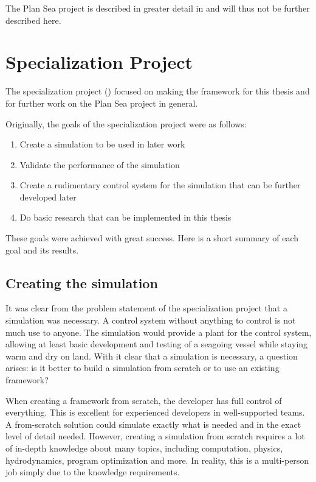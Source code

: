 \documentclass[class=article, crop=false, draft=true]{standalone}
\begin{document}
The Plan Sea project is described in greater detail in \cite{specialization} and will thus not be further described here.

\section{Specialization Project}
The specialization project (\cite{specialization}) focused on making the framework for this thesis and for further work on the Plan Sea project in general.

Originally, the goals of the specialization project were as follows:
\begin{enumerate}
\item Create a simulation to be used in later work
\item Validate the performance of the simulation
\item Create a rudimentary control system for the simulation that can be further developed later
\item Do basic research that can be implemented in this thesis
\end{enumerate}
These goals were achieved with great success. Here is a short summary of each goal and its results.

\subsection{Creating the simulation}
\label{sec:basic_sim}
It was clear from the problem statement of the specialization project that a simulation was necessary. A control system without anything to control is not much use to anyone. The simulation would provide a plant for the control system, allowing at least basic development and testing of a seagoing vessel while staying warm and dry on land. With it clear that a simulation is necessary, a question arises: is it better to build a simulation from scratch or to use an existing framework?

When creating a framework from scratch, the developer has full control of everything. This is excellent for experienced developers in well-supported teams. A from-scratch solution could simulate exactly what is needed and in the exact level of detail needed. However, creating a simulation from scratch requires a lot of in-depth knowledge about many topics, including computation, physics, hydrodynamics, program optimization and more. In reality, this is a multi-person job simply due to the knowledge requirements.
\end{document}
